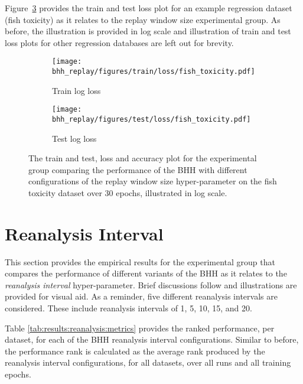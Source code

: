 Figure~\ref{fig:results:replay:figures:fish_toxicity} provides the train and test loss plot for an example regression dataset (fish toxicity) as it relates to the replay window size experimental group. As before, the illustration is provided in log scale and illustration of train and test loss plots for other regression databases are left out for brevity.

\begin{figure}[htbp]
	\begin{subfigure}{0.5\textwidth}
		\centering
		\texttt{[image: bhh\_replay/figures/train/loss/fish\_toxicity.pdf]}
		\caption{Train log loss}
		\label{fig:results:replay:figures:loss:train:fish_toxicity}
	\end{subfigure}
	\begin{subfigure}{0.5\textwidth}
		\centering
		\texttt{[image: bhh\_replay/figures/test/loss/fish\_toxicity.pdf]}
		\caption{Test log loss}
		\label{fig:results:replay:figures:loss:test:fish_toxicity}
	\end{subfigure}
	\par\bigskip
	\caption{The train and test, loss and accuracy plot for the experimental group comparing the performance of the \acs{BHH} with different configurations of the replay window size hyper-parameter on the fish toxicity dataset over 30 epochs, illustrated in log scale.}
	\label{fig:results:replay:figures:fish_toxicity}
\end{figure}



\section{Reanalysis Interval}\label{sec:results:reanalysis}

This section provides the empirical results for the experimental group that compares the performance of different variants of the \acs{BHH} as it relates to the \textit{reanalysis interval} hyper-parameter. Brief discussions follow and illustrations are provided for visual aid. As a reminder, five different reanalysis intervals are considered. These include reanalysis intervals of 1, 5, 10, 15, and 20.

Table \ref{tab:results:reanalysis:metrics} provides the ranked performance, per dataset, for each of the \acs{BHH} reanalysis interval configurations. Similar to before, the performance rank is calculated as the average rank produced by the reanalysis interval configurations, for all datasets, over all runs and all training epochs.

